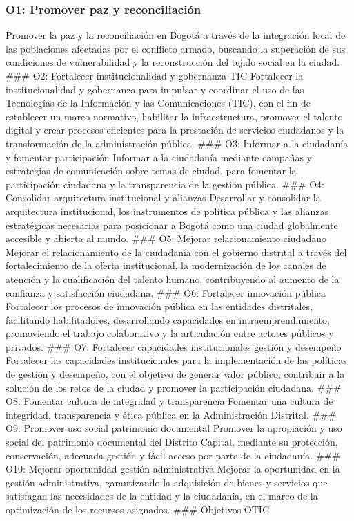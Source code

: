 \documentclass[
	a4paper, %
	12pt, %
]{include/CSSullivanBusinessReport}
\begin{document}
\subsubsection{O1: Promover paz y
reconciliación}\label{sec:o1-promover-paz-y-reconciliaciuxf3n}

Promover la paz y la reconciliación en Bogotá a través de la integración
local de las poblaciones afectadas por el conflicto armado, buscando la
superación de sus condiciones de vulnerabilidad y la reconstrucción del
tejido social en la ciudad. \#\#\# O2: Fortalecer institucionalidad y
gobernanza TIC Fortalecer la institucionalidad y gobernanza para
impulsar y coordinar el uso de las Tecnologías de la Información y las
Comunicaciones (TIC), con el fin de establecer un marco normativo,
habilitar la infraestructura, promover el talento digital y crear
procesos eficientes para la prestación de servicios ciudadanos y la
transformación de la administración pública. \#\#\# O3: Informar a la
ciudadanía y fomentar participación Informar a la ciudadanía mediante
campañas y estrategias de comunicación sobre temas de ciudad, para
fomentar la participación ciudadana y la transparencia de la gestión
pública. \#\#\# O4: Consolidar arquitectura institucional y alianzas
Desarrollar y consolidar la arquitectura institucional, los instrumentos
de política pública y las alianzas estratégicas necesarias para
posicionar a Bogotá como una ciudad globalmente accesible y abierta al
mundo. \#\#\# O5: Mejorar relacionamiento ciudadano Mejorar el
relacionamiento de la ciudadanía con el gobierno distrital a través del
fortalecimiento de la oferta institucional, la modernización de los
canales de atención y la cualificación del talento humano, contribuyendo
al aumento de la confianza y satisfacción ciudadana. \#\#\# O6:
Fortalecer innovación pública Fortalecer los procesos de innovación
pública en las entidades distritales, facilitando habilitadores,
desarrollando capacidades en intraemprendimiento, promoviendo el trabajo
colaborativo y la articulación entre actores públicos y privados. \#\#\#
O7: Fortalecer capacidades institucionales gestión y desempeño
Fortalecer las capacidades institucionales para la implementación de las
políticas de gestión y desempeño, con el objetivo de generar valor
público, contribuir a la solución de los retos de la ciudad y promover
la participación ciudadana. \#\#\# O8: Fomentar cultura de integridad y
transparencia Fomentar una cultura de integridad, transparencia y ética
pública en la Administración Distrital. \#\#\# O9: Promover uso social
patrimonio documental Promover la apropiación y uso social del
patrimonio documental del Distrito Capital, mediante su protección,
conservación, adecuada gestión y fácil acceso por parte de la
ciudadanía. \#\#\# O10: Mejorar oportunidad gestión administrativa
Mejorar la oportunidad en la gestión administrativa, garantizando la
adquisición de bienes y servicios que satisfagan las necesidades de la
entidad y la ciudadanía, en el marco de la optimización de los recursos
asignados. \#\#\# Objetivos OTIC
\end{document}
